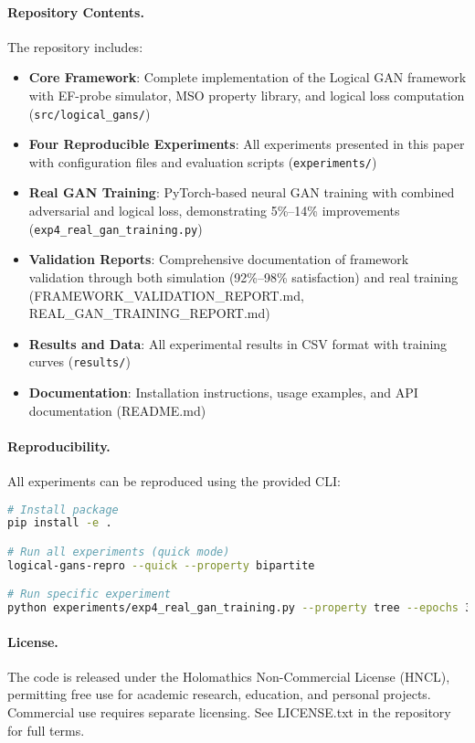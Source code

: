 \documentclass{article}
\begin{document}
\paragraph{Repository Contents.}
The repository includes:
\begin{itemize}[noitemsep]
    \item \textbf{Core Framework}: Complete implementation of the Logical GAN framework with EF-probe simulator, MSO property library, and logical loss computation (\texttt{src/logical\_gans/})
    \item \textbf{Four Reproducible Experiments}: All experiments presented in this paper with configuration files and evaluation scripts (\texttt{experiments/})
    \item \textbf{Real GAN Training}: PyTorch-based neural GAN training with combined adversarial and logical loss, demonstrating 5\%--14\% improvements (\texttt{exp4\_real\_gan\_training.py})
    \item \textbf{Validation Reports}: Comprehensive documentation of framework validation through both simulation (92\%--98\% satisfaction) and real training (FRAMEWORK\_VALIDATION\_REPORT.md, REAL\_GAN\_TRAINING\_REPORT.md)
    \item \textbf{Results and Data}: All experimental results in CSV format with training curves (\texttt{results/})
    \item \textbf{Documentation}: Installation instructions, usage examples, and API documentation (README.md)
\end{itemize}

\paragraph{Reproducibility.}
All experiments can be reproduced using the provided CLI:
\begin{lstlisting}[language=bash]
# Install package
pip install -e .

# Run all experiments (quick mode)
logical-gans-repro --quick --property bipartite

# Run specific experiment
python experiments/exp4_real_gan_training.py --property tree --epochs 300
\end{lstlisting}

\paragraph{License.}
The code is released under the Holomathics Non-Commercial License (HNCL), permitting free use for academic research, education, and personal projects. Commercial use requires separate licensing. See LICENSE.txt in the repository for full terms.
\end{document}
